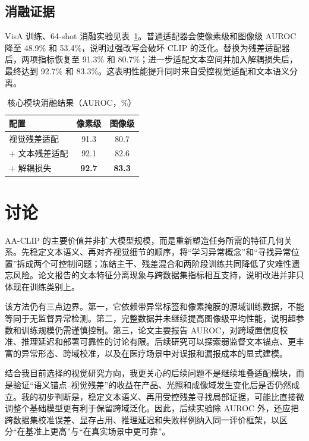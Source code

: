 \documentclass[UTF8,a4paper,10pt,fontset=windows]{ctexart}
\begin{document}
\subsection{消融证据}

VisA 训练、64-shot 消融实验见表~\ref{tab:ablation}。普通适配器会使像素级和图像级 AUROC 降至 48.9\% 和 53.4\%，说明过强改写会破坏 CLIP 的泛化。替换为残差适配器后，两项指标恢复至 91.3\% 和 80.7\%；进一步适配文本空间并加入解耦损失后，最终达到 92.7\% 和 83.3\%。这表明性能提升同时来自受控视觉适配和文本语义分离。

\begin{table}[t]
  \centering
  \caption{核心模块消融结果（AUROC，\%）\cite{ma2025}}
  \label{tab:ablation}
  \begin{tabular}{lcc}
    \toprule
    配置 & 像素级 & 图像级 \\
    \midrule
    视觉残差适配 & 91.3 & 80.7 \\
    $+$ 文本残差适配 & 92.1 & 82.6 \\
    $+$ 解耦损失 & \textbf{92.7} & \textbf{83.3} \\
    \bottomrule
  \end{tabular}
\end{table}

\section{讨论}

AA-CLIP 的主要价值并非扩大模型规模，而是重新塑造任务所需的特征几何关系。先稳定文本语义、再对齐视觉细节的顺序，将“学习异常概念”和“寻找异常位置”拆成两个可控制问题；冻结主干、残差混合和两阶段训练共同降低了灾难性遗忘风险。论文报告的文本特征分离现象与跨数据集指标相互支持，说明改进并非只体现在训练类别上。

该方法仍有三点边界。第一，它依赖带异常标签和像素掩膜的源域训练数据，不能等同于无监督异常检测。第二，完整数据并未继续提高图像级平均性能，说明超参数和训练规模仍需谨慎控制。第三，论文主要报告 AUROC，对跨域置信度校准、推理延迟和部署可靠性的讨论有限。后续研究可以探索弱监督文本锚点、更丰富的异常形态、跨域校准，以及在医疗场景中对误报和漏报成本的显式建模。

结合我目前选择的视觉研究方向，我更关心的后续问题不是继续堆叠适配模块，而是验证“语义锚点--视觉残差”的收益在产品、光照和成像域发生变化后是否仍然成立。我的初步判断是，稳定文本语义、再用受控残差寻找局部证据，可能比直接微调整个基础模型更有利于保留跨域泛化。因此，后续实验除 AUROC 外，还应把跨数据集校准误差、显存占用、推理延迟和失败样例纳入同一评价框架，以区分“在基准上更高”与“在真实场景中更可靠”。
\end{document}
